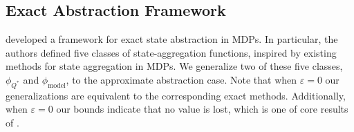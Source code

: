 \subsection{Exact Abstraction Framework}

\citet{li2006towards} developed a framework for exact state abstraction in \acp{MDP}. In particular, the authors defined five classes of state-aggregation functions, inspired by existing methods for state aggregation in \acp{MDP}. We generalize two of these five classes, $\phi_{Q^*}$ and $\phi_{\text{model}}$, to the approximate abstraction case. Note that when $\varepsilon=0$ our generalizations are equivalent to the corresponding exact methods. Additionally, when $\varepsilon=0$ our bounds indicate that no value is lost, which is one of core results of \citet{li2006towards}.

